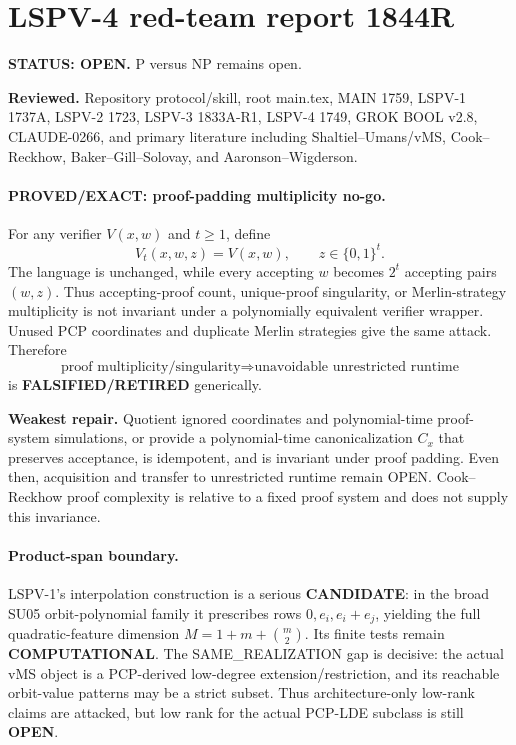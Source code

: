 \documentclass[11pt]{article}
\begin{document}
\section*{LSPV-4 red-team report 1844R}
\textbf{STATUS: OPEN.} P versus NP remains open.

\textbf{Reviewed.} Repository protocol/skill, root main.tex, MAIN 1759, LSPV-1 1737A, LSPV-2 1723, LSPV-3 1833A-R1, LSPV-4 1749, GROK BOOL v2.8, CLAUDE-0266, and primary literature including Shaltiel--Umans/vMS, Cook--Reckhow, Baker--Gill--Solovay, and Aaronson--Wigderson.

\paragraph{PROVED/EXACT: proof-padding multiplicity no-go.}
For any verifier $V(x,w)$ and $t\ge1$, define
\[
V_t(x,w,z)=V(x,w),\qquad z\in\{0,1\}^t.
\]
The language is unchanged, while every accepting $w$ becomes $2^t$ accepting pairs $(w,z)$. Thus accepting-proof count, unique-proof singularity, or Merlin-strategy multiplicity is not invariant under a polynomially equivalent verifier wrapper. Unused PCP coordinates and duplicate Merlin strategies give the same attack. Therefore
\[
\text{proof multiplicity/singularity}\Rightarrow\text{unavoidable unrestricted runtime}
\]
is \textbf{FALSIFIED/RETIRED} generically.

\textbf{Weakest repair.} Quotient ignored coordinates and polynomial-time proof-system simulations, or provide a polynomial-time canonicalization $C_x$ that preserves acceptance, is idempotent, and is invariant under proof padding. Even then, acquisition and transfer to unrestricted runtime remain OPEN. Cook--Reckhow proof complexity is relative to a fixed proof system and does not supply this invariance.

\paragraph{Product-span boundary.}
LSPV-1's interpolation construction is a serious \textbf{CANDIDATE}: in the broad SU05 orbit-polynomial family it prescribes rows $0,e_i,e_i+e_j$, yielding the full quadratic-feature dimension $M=1+m+\binom m2$. Its finite tests remain \textbf{COMPUTATIONAL}. The SAME\_REALIZATION gap is decisive: the actual vMS object is a PCP-derived low-degree extension/restriction, and its reachable orbit-value patterns may be a strict subset. Thus architecture-only low-rank claims are attacked, but low rank for the actual PCP-LDE subclass is still \textbf{OPEN}.
\end{document}
